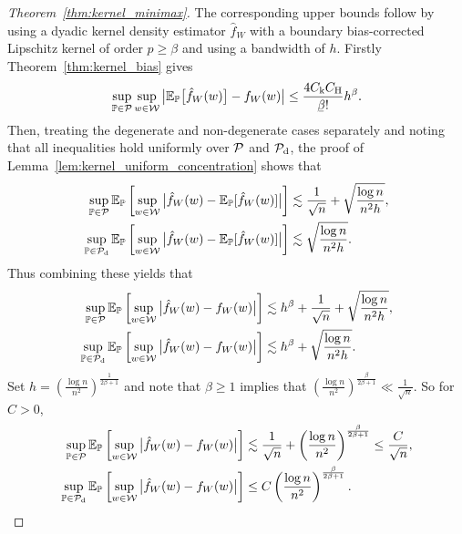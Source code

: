 \begin{proof}[Theorem~\ref{thm:kernel_minimax}]

  The corresponding upper bounds follow by
  using a dyadic kernel density estimator $\hat f_W$
  with a boundary bias-corrected
  Lipschitz kernel of order $p \geq \beta$
  and using a bandwidth of $h$.
  Firstly Theorem~\ref{thm:kernel_bias} gives
  \begin{align*}
    \sup_{\P \in \cP}
    \sup_{w \in \cW}
    \big|
    \E_\P\big[\hat f_W(w)\big]
    - f_W(w)
    \big|
    \leq
    \frac{4C_\rk C_\rH}{\flbeta !}
    h^\beta.
  \end{align*}
  Then,
  treating the degenerate and non-degenerate cases separately
  and noting that all inequalities hold uniformly over
  $\mathcal{P}$ and $\mathcal{P}_{\mathrm{d}}$,
  the proof of Lemma~\ref{lem:kernel_uniform_concentration}
  shows that
  \begin{align*}
    \sup_{\mathbb{P} \in \mathcal{P}}
    \mathbb{E}_{\mathbb{P}}\left[
      \sup_{w \in \mathcal{W}}
      \big|\hat f_W(w) - \mathbb{E}_{\mathbb{P}}[\hat f_W(w)]\big|
    \right]
    &\lesssim
    \frac{1}{\sqrt n}
    + \sqrt{\frac{\log n}{n^2h}}, \\
    \sup_{\mathbb{P} \in \mathcal{P}_{\mathrm{d}}}
    \mathbb{E}_{\mathbb{P}}\left[
      \sup_{w \in \mathcal{W}}
      \big|\hat f_W(w) - \mathbb{E}_{\mathbb{P}}[\hat f_W(w)]\big|
    \right]
    &\lesssim
    \sqrt{\frac{\log n}{n^2h}}.
  \end{align*}
  Thus combining these yields that
  \begin{align*}
    \sup_{\mathbb{P} \in \mathcal{P}}
    \mathbb{E}_{\mathbb{P}}\left[
      \sup_{w \in \mathcal{W}}
      \big|\hat f_W(w) - f_W(w)\big|
    \right]
    &\lesssim
    h^\beta
    + \frac{1}{\sqrt n}
    + \sqrt{\frac{\log n}{n^2h}}, \\
    \sup_{\mathbb{P} \in \mathcal{P}_{\mathrm{d}}}
    \mathbb{E}_{\mathbb{P}}\left[
      \sup_{w \in \mathcal{W}}
      \big|\hat f_W(w) - f_W(w)\big|
    \right]
    &\lesssim
    h^\beta
    + \sqrt{\frac{\log n}{n^2h}}.
  \end{align*}
  Set $h = \left( \frac{\log n}{n^2} \right)^{\frac{1}{2\beta+1}}$
  and note that $\beta \geq 1$ implies that
  $\left(\frac{\log n}{n^2} \right)^{\frac{\beta}{2\beta+1}}
  \ll \frac{1}{\sqrt n}$.
  So for $C > 0$,
  \begin{align*}
    \sup_{\mathbb{P} \in \mathcal{P}}
    \mathbb{E}_{\mathbb{P}}\left[
      \sup_{w \in \mathcal{W}}
      \big|\hat f_W(w) - f_W(w)\big|
    \right]
    &\lesssim
    \frac{1}{\sqrt n}
    + \left(
      \frac{\log n}{n^2}
    \right)^{\frac{\beta}{2\beta+1}}
    \leq
    \frac{C}{\sqrt n}, \\
    \sup_{\mathbb{P} \in \mathcal{P}_{\mathrm{d}}}
    \mathbb{E}_{\mathbb{P}}\left[
      \sup_{w \in \mathcal{W}}
      \big|\hat f_W(w) - f_W(w)\big|
    \right]
    &\leq
    C\left(
      \frac{\log n}{n^2}
    \right)^{\frac{\beta}{2\beta+1}}.
  \end{align*}
\end{proof}

